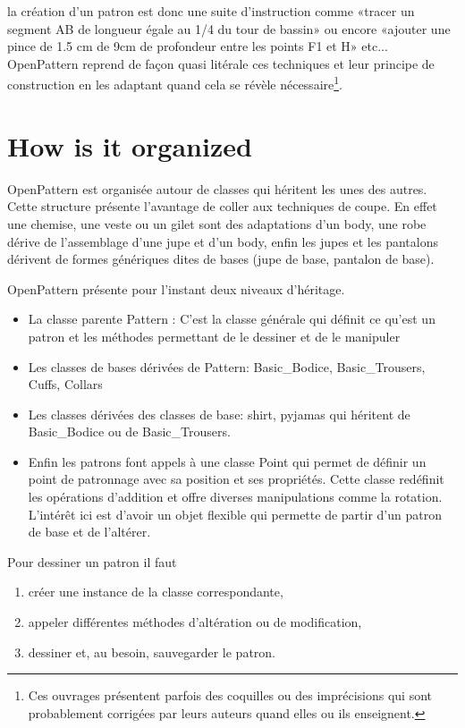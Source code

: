 \documentclass[11pt,a4paper]{report}
\begin{document}
la création d'un patron est donc une suite d'instruction comme «tracer un segment AB de longueur égale au 1/4 du tour de bassin» ou encore «ajouter une pince de 1.5 cm de 9cm de profondeur entre les points F1 et H» etc...
OpenPattern reprend de façon quasi litérale ces techniques et leur principe de construction en les adaptant quand cela se révèle nécessaire\footnote{Ces ouvrages présentent parfois des coquilles ou des imprécisions qui  sont probablement corrigées par leurs auteurs quand elles ou ils enseignent.}.


\section{How is it organized}

OpenPattern est organisée autour de classes qui héritent les unes des autres. Cette structure présente l'avantage de coller aux techniques de coupe. En effet une chemise, une veste ou un gilet sont des adaptations d'un body, une robe dérive de l'assemblage d'une jupe et d'un body, enfin les jupes et les pantalons dérivent de formes génériques dites de bases (jupe de base, pantalon de base).

OpenPattern présente pour l'instant deux niveaux d'héritage.
\begin{itemize}
\item La classe parente Pattern : C'est la classe générale qui définit ce qu'est un patron et les méthodes permettant de le dessiner et de le manipuler
\item Les classes de bases dérivées de Pattern: Basic\_Bodice, Basic\_Trousers, Cuffs, Collars
\item Les classes dérivées des classes de base: shirt, pyjamas qui héritent de Basic\_Bodice ou de Basic\_Trousers. \item Enfin les patrons font appels à une classe Point qui permet de définir un point de patronnage avec sa position et ses propriétés. Cette classe redéfinit les opérations d'addition et offre diverses manipulations  comme la rotation. L'intérêt ici est d'avoir un objet flexible qui permette de partir d'un patron de base et de l'altérer.
\end{itemize}

Pour dessiner un patron il faut
\begin{enumerate}
\item créer une instance de la classe correspondante,
\item appeler différentes méthodes d'altération ou de modification,
\item dessiner et, au besoin, sauvegarder le patron.
\end{enumerate}
\end{document}

